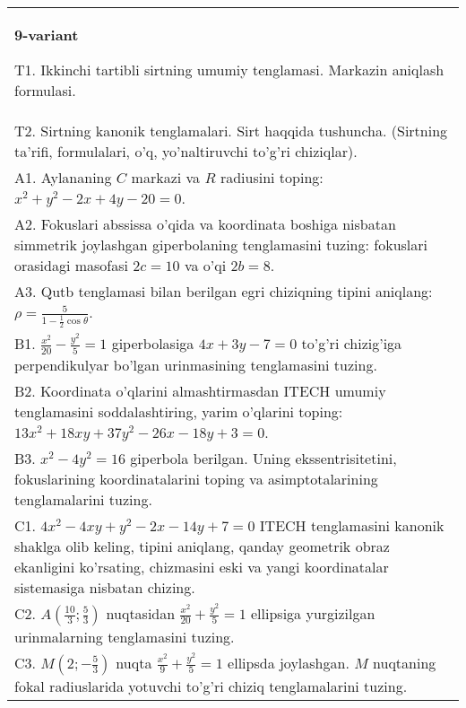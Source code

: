 \documentclass{article}
\begin{document}
\begin{tabular}{m{17cm}}
\textbf{9-variant}
\newline

T1. Ikkinchi tartibli sirtning umumiy tenglamasi. Markazin aniqlash formulasi.\\

T2. Sirtning kanonik tenglamalari. Sirt haqqida tushuncha. (Sirtning ta'rifi, formulalari, o'q, yo'naltiruvchi to'g'ri chiziqlar).\\

A1. Aylananing $C$ markazi va $R$ radiusini toping: $x^2+y^2-2x+4y-20=0$.\\

A2. Fokuslari abssissa o'qida va koordinata boshiga nisbatan simmetrik joylashgan giperbolaning tenglamasini tuzing: fokuslari orasidagi masofasi $2c=10$ va o'qi $2b=8$.\\

A3. Qutb tenglamasi bilan berilgan egri chiziqning tipini aniqlang: $\rho=\frac{5}{1-\frac{1}{2}\cos\theta}$.\\

B1. $\frac{x^{2}}{20} - \frac{y^{2}}{5} = 1$ giperbolasiga $4x + 3y - 7 = 0$ to'g'ri chizig'iga perpendikulyar bo'lgan urinmasining tenglamasini tuzing.  \\

B2. Koordinata o'qlarini almashtirmasdan ITECH umumiy tenglamasini soddalashtiring, yarim o'qlarini toping: $13x^{2} + 18xy + 37y^{2} - 26x - 18y + 3 = 0$.  \\

B3. $x^{2} - 4y^{2} = 16$ giperbola berilgan. Uning ekssentrisitetini, fokuslarining koordinatalarini toping va asimptotalarining tenglamalarini tuzing.\\

C1. $4x^{2} - 4xy + y^{2} - 2x - 14y + 7 = 0$ ITECH tenglamasini kanonik shaklga olib keling, tipini aniqlang, qanday geometrik obraz ekanligini ko'rsating, chizmasini eski va yangi koordinatalar sistemasiga nisbatan chizing.  \\

C2. $A(\frac{10}{3};\frac{5}{3})$ nuqtasidan $\frac{x^{2}}{20} + \frac{y^{2}}{5} = 1$ ellipsiga yurgizilgan urinmalarning tenglamasini tuzing.  \\

C3. $M(2; - \frac{5}{3})$ nuqta $\frac{x^{2}}{9} + \frac{y^{2}}{5} = 1$ ellipsda joylashgan. $M$ nuqtaning fokal radiuslarida yotuvchi to'g'ri chiziq tenglamalarini tuzing.  \\

\end{tabular}
\vspace{1cm}
\end{document}
